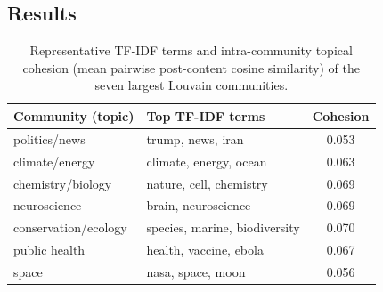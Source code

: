 \subsection{Results}
\begin{table}[h]
  \centering\footnotesize
  \setlength{\tabcolsep}{4pt}
  \caption{Representative TF-IDF terms and intra-community topical cohesion (mean pairwise post-content cosine similarity) of the seven largest Louvain communities.}
  \label{tab:topics}
  \begin{tabular}{llc}
    \toprule
    Community (topic) & Top TF-IDF terms & Cohesion \\
    \midrule
    politics/news        & trump, news, iran             & 0.053 \\
    climate/energy       & climate, energy, ocean        & 0.063 \\
    chemistry/biology    & nature, cell, chemistry       & 0.069 \\
    neuroscience         & brain, neuroscience           & 0.069 \\
    conservation/ecology & species, marine, biodiversity & 0.070 \\
    public health        & health, vaccine, ebola        & 0.067 \\
    space                & nasa, space, moon             & 0.056 \\
    \bottomrule
  \end{tabular}
\end{table}
